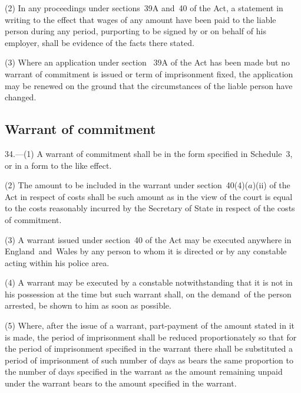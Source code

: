 \documentclass[12pt,a4paper]{article}
\begin{document}
(2) In any proceedings under 
sections~39A and~40  %
of the Act, a statement in writing to the effect that wages of any amount have been paid to the liable person during any period, purporting to be signed by or on behalf of his employer, shall be evidence of the facts there stated.

(3) Where an application under section~%
39A  %
of the Act has been made but no warrant of commitment is issued or term of imprisonment fixed, the application may be renewed on the ground that the circumstances of the liable person have changed.


\subsection[34. Warrant of commitment]{Warrant of commitment}

34.—(1) A warrant of commitment shall be in the form specified in Schedule~3, or in a form to the like effect.

(2) The amount to be included in the warrant under section~40(4)($a$)(ii) of the Act in respect of costs shall be such amount as in the view of the court is equal to the costs reasonably incurred by the Secretary of State in respect of the costs of commitment.

(3) A warrant issued under section~40 of the Act may be executed anywhere in England~and~Wales by any person to whom it is directed or by any constable acting within his police area.

(4) A warrant may be executed by a constable notwithstanding that it is not in his possession at the time but such warrant shall, on the demand~of the person arrested, be shown to him as soon as possible.

(5) Where, after the issue of a warrant, part-payment of the amount stated in it is made, the period of imprisonment shall be reduced proportionately so that for the period of imprisonment specified in the warrant there shall be substituted a period of imprisonment of such number of days as bears the same proportion to the number of days specified in the warrant as the amount remaining unpaid under the warrant bears to the amount specified in the warrant.
\end{document}
